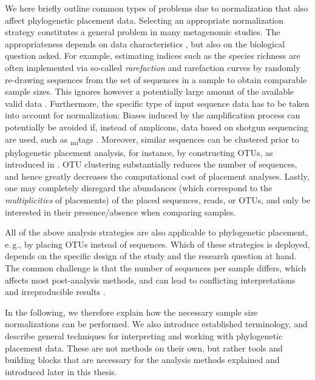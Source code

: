 We here briefly outline common types of problems due to normalization that also affect phylogenetic placement data.
Selecting an appropriate normalization strategy constitutes a general problem in many metagenomic studies.
The appropriateness depends on data characteristics \cite{Weiss2017}, but also on the biological question asked.
For example, estimating indices such as the species richness are often implemented
via so-called \emph{rarefaction} and rarefaction curves \cite{Gotelli2001}
by randomly re-drawing sequences from the set of sequences in a sample to obtain comparable sample sizes.
This ignores however a potentially large amount of the available valid data \cite{McMurdie2014}.
Furthermore, the specific type of input sequence data has to be taken into account for normalization:
Biases induced by the amplification process can potentially be avoided if, instead of amplicons,
data based on shotgun sequencing are used, such as \textsubscript{mi}tags \cite{Logares2014}.
Moreover, similar sequences can be clustered prior to phylogenetic placement analysis, for instance,
by constructing \acfp{OTU}, as introduced in .
\ac{OTU} clustering substantially reduces the number of sequences,
and hence greatly decreases the computational cost of placement analyses.
Lastly, one may completely disregard the abundances (which correspond to the \emph{multiplicities} of placements)
of the placed sequences, reads, or OTUs, and only be interested in their presence/absence when comparing samples.


All of the above analysis strategies are also applicable to phylogenetic placement,
e.\,g., by placing OTUs instead of sequences.
Which of these strategies is deployed,
depends on the specific design of the study and the research question at hand.
The common challenge is that the number of sequences per sample differs, which affects most post-analysis methods,
and can lead to conflicting interpretations and irreproducible results \cite{Gloor2016,Tsilimigras2016}.

In the following, we therefore explain how the necessary sample size normalizations can be performed.
We also introduce established terminology,
and describe general techniques for interpreting and working with phylogenetic placement data.
These are not methods on their own, but rather tools and building blocks
that are necessary for the analysis methods explained and introduced later in this thesis.

